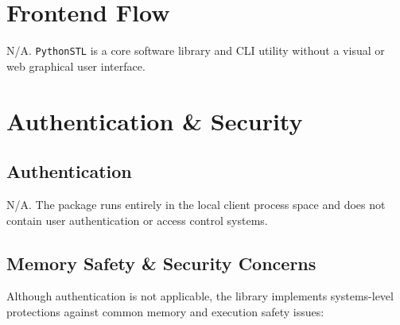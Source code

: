 \documentclass[11pt,a4paper]{article}
\begin{document}
\section{Frontend Flow}
N/A. \texttt{PythonSTL} is a core software library and CLI utility without a visual or web graphical user interface.

\newpage

\section{Authentication \& Security}

\subsection{Authentication}
N/A. The package runs entirely in the local client process space and does not contain user authentication or access control systems.

\subsection{Memory Safety & Security Concerns}
Although authentication is not applicable, the library implements systems-level protections against common memory and execution safety issues:
\end{document}
